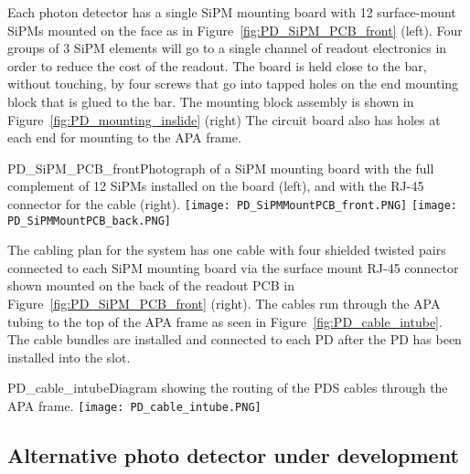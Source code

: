 
Each photon detector has a single SiPM mounting board with 12 surface-mount SiPMs 
mounted on the face as in Figure~\ref{fig:PD_SiPM_PCB_front} (left).
Four groups of $3$ SiPM elements will go to a single 
channel of readout electronics in order to reduce the cost of the readout.
The board is held close to the bar, without touching, by four screws that go into 
tapped holes on the end mounting block that is glued to the bar.  
The mounting block assembly is shown in Figure~\ref{fig:PD_mounting_inslide} (right) %
The circuit board also has holes at each end for mounting to the APA frame.  

\begin{cdrfigure}
  {PD_SiPM_PCB_front}{Photograph of a SiPM mounting board
    with the full complement of 12 SiPMs installed on the board (left), and with the 
    RJ-45 connector for the cable (right).}
\texttt{[image: PD\_SiPMMountPCB\_front.PNG]}
\texttt{[image: PD\_SiPMMountPCB\_back.PNG]}
\end{cdrfigure}


The cabling plan for the system has one cable with four shielded twisted pairs 
connected to each SiPM mounting board via the surface mount RJ-45 connector
shown mounted on the back of the readout PCB in 
Figure~\ref{fig:PD_SiPM_PCB_front} (right).  
The cables run through the APA tubing to the top of the APA frame as seen
in Figure~\ref{fig:PD_cable_intube}.
The cable bundles are installed and connected to each PD 
after the PD has been installed into the slot.
\begin{cdrfigure}
  {PD_cable_intube}{Diagram showing the routing of the PDS cables
    through the APA frame.}
\texttt{[image: PD\_cable\_intube.PNG]}
\end{cdrfigure}


\subsection{Alternative photo detector under development}


